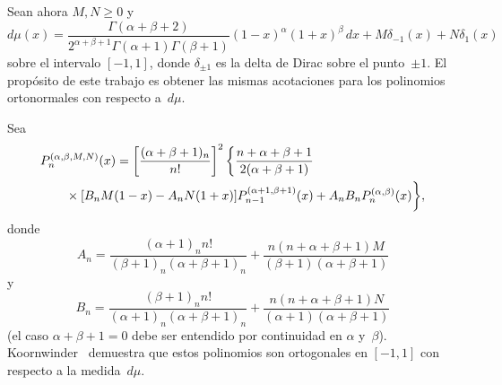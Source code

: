 \documentclass[a4paper]{article}
\begin{document}
Sean ahora $M,N \geq 0$ y
$$
d\mu(x) = \frac{\Gamma(\alpha+\beta+2)}
  {2^{\alpha+\beta+1}\Gamma(\alpha+1)\Gamma(\beta+1)}
(1-x)^{\alpha} (1+x)^{\beta} \,dx + M \delta_{-1}(x) + N \delta_{1}(x)
$$
sobre el intervalo $[-1,1]$, donde $\delta_{\pm1}$ 
es la delta de Dirac sobre el punto~$\pm1$. El prop\'{o}sito 
de este trabajo es obtener las mismas acotaciones para los polinomios 
ortonormales con respecto a~$d\mu$.

Sea
\begin{equation}
\label{eq:1}
\begin{aligned}
&P^{(\alpha,\beta,M,N)}_{n}(x) =
\left[\frac{(\alpha+\beta+1)_{n}}{n!}\right]^{2} 
\bigg\{ \frac{n+\alpha+\beta+1}{2(\alpha+\beta+1)} \\
&\qquad\null\times [B_{n}M(1-x)-A_{n}N(1+x)] P^{(\alpha+1,\beta+1)}_{n-1}(x) 
+ A_{n}B_{n}P^{(\alpha,\beta)}_{n}(x) \bigg\},
\end{aligned}
\end{equation}
donde
$$
A_{n} = \frac{(\alpha+1)_{n} n!}{(\beta+1)_{n}(\alpha+\beta+1)_{n}}
+ \frac{n(n+\alpha+\beta+1)M}{(\beta+1)(\alpha+\beta+1)}
$$
y
$$
B_{n} = \frac{(\beta+1)_{n} n!}{(\alpha+1)_{n}(\alpha+\beta+1)_{n}} 
+ \frac{n(n+\alpha+\beta+1)N}{(\alpha+1)(\alpha+\beta+1)}
$$
(el caso $\alpha+\beta+1 = 0$ debe ser entendido por continuidad 
en $\alpha$ y~$\beta$). Koornwinder~\cite{Ko} demuestra que estos 
polinomios son ortogonales en $[-1,1]$ con respecto a la medida~$d\mu$.
\end{document}
